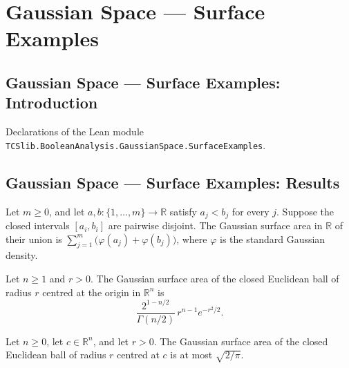 \section{Gaussian Space --- Surface Examples}
\subsection*{Gaussian Space --- Surface Examples: Introduction}

Declarations of the Lean module \texttt{TCSlib.BooleanAnalysis.GaussianSpace.SurfaceExamples}.

\subsection*{Gaussian Space --- Surface Examples: Results}

\begin{theorem}
\label{BooleanAnalysis.GaussianSpace.surfaceArea_disjoint_intervals}
\leanok
{}
Let $m\ge 0$, and let $a,b:\{1,\ldots,m\}\to\mathbb R$ satisfy $a_j<b_j$ for every $j$.
Suppose the closed intervals $[a_i,b_i]$ are pairwise disjoint. The Gaussian surface
area in $\mathbb R$ of their union is
$\sum_{j=1}^m\bigl(\varphi(a_j)+\varphi(b_j)\bigr)$, where $\varphi$ is the standard
Gaussian density.
\end{theorem}

\begin{theorem}
\label{BooleanAnalysis.GaussianSpace.surfaceArea_centered_ball}
\leanok
{}
Let $n\ge 1$ and $r>0$. The Gaussian surface area of the closed Euclidean ball of radius
$r$ centred at the origin in $\mathbb R^n$ is
\[\frac{2^{1-n/2}}{\Gamma(n/2)}\,r^{n-1}e^{-r^2/2}.\]
\end{theorem}

\begin{theorem}
\label{BooleanAnalysis.GaussianSpace.surfaceArea_ball_le}
\leanok
{}
Let $n\ge 0$, let $c\in\mathbb R^n$, and let $r>0$. The Gaussian surface area of the
closed Euclidean ball of radius $r$ centred at $c$ is at most $\sqrt{2/\pi}$.
\end{theorem}

